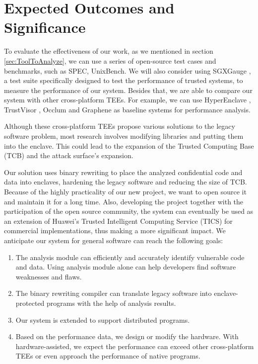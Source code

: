 \section{Expected Outcomes and Significance}
To evaluate the effectiveness of our work, as we mentioned in section
\ref{sec:ToolToAnalyze}, we can use a series of open-source test cases and benchmarks,
such as SPEC, UnixBench.
We will also consider using SGXGauge \cite{Kumar2022ACB}, a test suite specifically
designed to test the performance of trusted systems, to measure the performance
of our system.
Besides that, we are able to compare our system with other cross-platform TEEs.
For example, we can use HyperEnclave \cite{Jia2022HyperEnclaveAO}, TrustVisor
\cite{McCune2010TrustVisorET}, Occlum \cite{Shen2020OcclumSA} and Graphene
\cite{Tsai2017GrapheneSGXAP} as baseline systems for performance analysis.

Although these cross-platform TEEs propose various solutions to the legacy
software problem, most research involves modifying libraries and putting
them into the enclave.
This could lead to the expansion of the Trusted Computing Base (TCB)
and the attack surface's expansion.

Our solution uses binary rewriting to place the analyzed confidential code and data
into enclaves, hardening the legacy software and reducing the size of TCB.
Because of the highly practicality of our new project, we want to open source it and
maintain it for a long time. Also, developing the project together with the participation
of the open source community, the system can eventually be used as an extension of
Huawei's Trusted Intelligent Computing Service (TICS) for commercial implementations,
thus making a more significant impact.
We anticipate our system for general software can reach the following goals:
\begin{enumerate}[(1)]
    \item The analysis module can efficiently and accurately identify vulnerable code and data.
    Using analysis module alone can help developers find software weaknesses and flaws.
    \item The binary rewriting compiler can translate legacy software into enclave-protected programs
    with the help of analysis results.
    \item Our system is extended to support distributed programs.
    \item Based on the performance data, we design or modify the hardware.
    With hardware-assisted, we expect the performance can exceed other cross-platform TEEs
    or even approach the performance of native programs.
\end{enumerate}